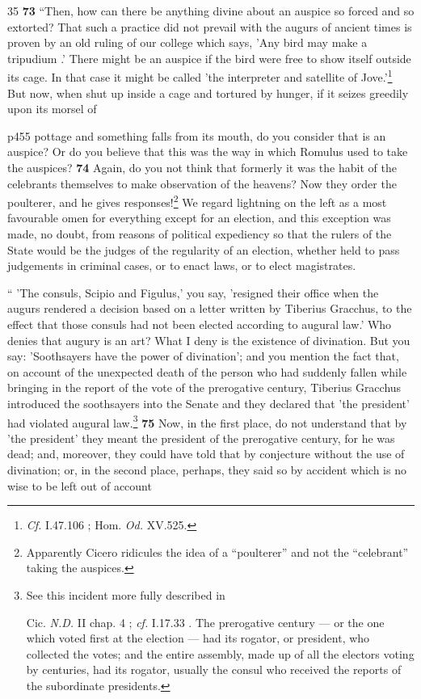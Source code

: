 35
\textbf{73} ``Then, how can there be anything divine about an auspice so forced and so extorted? That such a practice did not prevail with the augurs of ancient times is proven by an old ruling of our college which says, 'Any bird may make a tripudium .' There might be an auspice if the bird were free to show itself outside its cage. In that case it might be called 'the interpreter and satellite of Jove.'\texthebrew{}\footnote{\emph{Cf.}
I.47.106 ; Hom. \emph{Od.} XV.525.

} But now, when shut up inside a cage and tortured by hunger, if it seizes greedily upon its morsel of

p455 pottage and something falls from its mouth, do you consider that is an auspice? Or do you believe that this was the way in which Romulus used to take the auspices? \textbf{74} Again, do you not think that formerly it was the habit of the celebrants themselves to make observation of the heavens? Now they order the poulterer, and he gives responses!\texthebrew{}\footnote{Apparently Cicero ridicules the idea of a ``poulterer'' and not the ``celebrant'' taking the auspices.

} We regard lightning on the left as a most favourable omen for everything except for an election, and this exception was made, no doubt, from reasons of political expediency so that the rulers of the State would be the judges of the regularity of an election, whether held to pass judgements in criminal cases, or to enact laws, or to elect magistrates.

`` 'The consuls, Scipio and Figulus,' you say, 'resigned their office when the augurs rendered a decision based on a letter written by Tiberius Gracchus, to the effect that those consuls had not been elected according to augural law.' Who denies that augury is an art? What I deny is the existence of divination. But you say: 'Soothsayers have the power of divination'; and you mention the fact that, on account of the unexpected death of the person who had suddenly fallen while bringing in the report of the vote of the prerogative century, Tiberius Gracchus introduced the soothsayers into the Senate and they declared that 'the president' had violated augural law.\texthebrew{}\footnote{See this incident more fully described in

Cic. \emph{N.D.} II chap. 4 ; \emph{cf.}
I.17.33 . The prerogative century \texthebrew{—} or the one which voted first at the election \texthebrew{—} had its rogator, or president, who collected the votes; and the entire assembly, made up of all the electors voting by centuries, had its rogator, usually the consul who received the reports of the subordinate presidents.

} \textbf{75} Now, in the first place, do not understand that by 'the president' they meant the president of the prerogative century, for he was dead; and, moreover, they could have told that by conjecture without the use of divination; or, in the second place, perhaps, they said so by accident which is no wise to be left out of account

